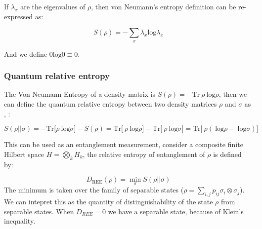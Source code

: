 If $\lambda_x$ are the eigenvalues of $\rho$, then von Neumann's entropy definition can be re-expressed as:

\begin{equation}
    S(\rho) = - \sum_x \lambda_x \mathrm{log} \lambda_x
\end{equation}

And we define $0\mathrm{log}0 \equiv 0$.

\subsubsection{Quantum relative entropy}
\label{Subsubsec: Quantum Relative entropy}

The Von Neumann Entropy of a density matrix is $S(\rho) = - \mathrm{Tr} \ \rho \ \mathrm{log}\rho$, then we can define the quantum relative entropy between two density matrices $\rho$ and $\sigma$ as \cite{vedral2002role}, \cite{nielsen_chuang_2010}:

\begin{equation}
    S(\rho || \sigma) = - \mathrm{Tr} \big[ \rho \ \mathrm{log}\sigma \big] - S(\rho) = \mathrm{Tr} \big[ \ \rho \ \mathrm{log}\rho \big] - \mathrm{Tr} \big[ \ \rho \ \mathrm{log}\sigma \big] = \mathrm{Tr} \big[\ \rho ( \ \mathrm{log}\rho - \ \mathrm{log}\sigma) \big]
\end{equation}

This can be used as an entanglement measurement, consider a composite finite Hilbert space $H = \bigotimes_k H_k$, the relative entropy of entanglement of $\rho$ is defined by:

\begin{equation}
    D_{\mathrm{REE}}(\rho) = \min_{\sigma} S(\rho || \sigma)
\end{equation}
The minimum is taken over the family of separable states ($\rho = \sum_{i,j} p_{ij} \sigma_i \otimes \sigma_j$). We can intepret this as the quantity of distinguishability of the state $\rho$ from separable states. When $D_{REE} = 0$ we have a separable state, because of Klein's inequality.

